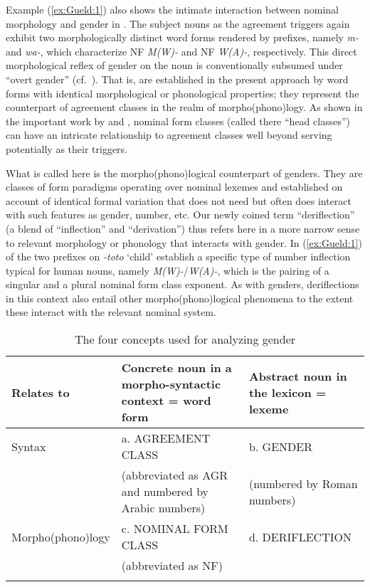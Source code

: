 \documentclass[output=collectionpaper]{langsci/langscibook}
\begin{document}
Example (\ref{ex:Gueld:1}) also shows the intimate interaction between nominal morphology and gender in . The subject nouns as the agreement triggers again exhibit two morphologically distinct word forms rendered by prefixes, namely \textit{m-} and \textit{wa-}, which characterize NF \textit{M(W)-} and NF \textit{W(A)-}, respectively. This direct morphological reflex of gender on the noun is conventionally subsumed under ``overt gender'' (cf.\ \citealt[44, 62--63, 117--118]{Corbett1991}). That is,  are established in the present approach by word forms with identical morphological or phonological properties; they represent the counterpart of agreement classes in the realm of morpho(phono)logy. As shown in the important work by \citet{Evans1997} and \citet{Evans1998}, nominal form classes (called there ``head classes'') can have an intricate relationship to agreement classes well beyond serving potentially as their triggers.

What is called here  is the morpho(phono)logical counterpart of genders.
\label{page:Gueld:def}%
They are classes of form paradigms operating over nominal lexemes and established on account of identical formal variation that does not need but often does interact with such features as gender, number, etc. Our newly coined term ``deriflection'' (a blend of ``inflection'' and ``derivation'') thus refers here in a more narrow sense to relevant morphology or phonology that interacts with gender. In (\ref{ex:Gueld:1}) of  the two prefixes on \textit{{}-toto} `child' establish a specific type of number inflection typical for human nouns, namely \textit{M(W)-}/\textit{W(A)-}, which is the pairing of a singular and a plural nominal form class exponent. As with genders, deriflections in this context also entail other morpho(phono)logical phenomena to the extent these interact with the relevant nominal system.

\begin{table}[!htb]
\begin{tabularx}{\textwidth}{lQQ}
\lsptoprule

Relates to & Concrete noun in a morpho-syntactic context = word form & Abstract noun in the lexicon = lexeme\\
\midrule
Syntax & a. AGREEMENT CLASS & b. GENDER \\
 & (abbreviated as AGR and numbered by Arabic numbers) & (numbered by Roman numbers)\\
Morpho(phono)logy & c. NOMINAL FORM CLASS & d. DERIFLECTION\\
 & (abbreviated as NF) \\
\lspbottomrule
\end{tabularx}
%
\caption{The four concepts used for analyzing gender}
\label{tab:Gueld:1}
\end{table}
\end{document}
